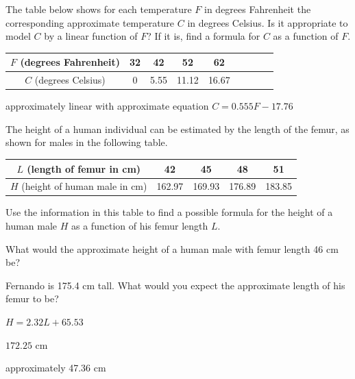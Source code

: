 \begin{exercise}
The table below shows for each temperature $F$ in degrees Fahrenheit the corresponding approximate temperature $C$ in degrees Celsius. Is it appropriate to model $C$ by a linear function of $F$? If it is, find a formula for $C$ as a function of $F$.
\begin{center}
\begin{tabular}{|c|c|c|c|c|c|cc c|}
\hline $F$ (degrees Fahrenheit) & 32 & 42 & 52 & 62 
\\\hline $C$ (degrees Celsius) & 0 & 5.55 & 11.12 & 16.67 
\\\hline
\end{tabular}
\end{center}
\end{exercise}

\begin{solution}
approximately linear with approximate equation $C=0.555F-17.76$
\end{solution}



\begin{exercise}
The height of a human individual can be estimated by the length of the femur, as shown for males in the following table.
\begin{center}
\begin{tabular}{|c|c|c|c|c|}
\hline $L$ (length of femur in cm) & 42 & 45 & 48  & 51
\\\hline $H$ (height of human male in cm) & 162.97 & 169.93 & 176.89 &183.85
\\\hline
\end{tabular}
\end{center}

\begin{parts}
    \item Use the information in this table to find a possible formula for the height of a human male $H$ as a function of his femur length $L$.
    
    \item What would the approximate height of a human male with femur length 46 cm be?
    
    \item Fernando is 175.4 cm tall. What would you expect the approximate length of his femur to be?
\end{parts}
\end{exercise}

\begin{solution}
\begin{parts}
    \item $H=2.32L+65.53$
    \item $172.25$ cm
    \item approximately 47.36 cm
\end{parts}
\end{solution}




